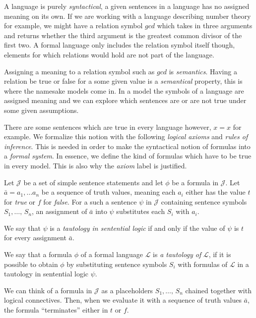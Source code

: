 \documentclass[../../main.tex]{subfiles}
\begin{document}
A language is purely \textit{syntactical}, a given sentences in a language has no assigned meaning on its own.
If we are working with a language describing number theory for example, 
we might have a relation symbol $gcd$ which takes in three arguments and returns whether the third argument is the greatest common divisor of the first two.
A formal language only includes the relation symbol itself though, elements for which relations would hold are not part of the language.

Assigning a meaning to a relation symbol such as $gcd$ is \textit{semantics}.
Having a relation be true or false for a some given value is a \textit{semantical} property, this is where the namesake models come in.
In a model the symbols of a language are assigned meaning and we can explore which sentences are or are not true under some given assumptions.\cite[p.3]{Cha90}

There are some sentences which are true in every language however, $x = x$ for example.
We formalize this notion with the following \textit{logical axioms} and \textit{rules of inference}.
This is needed in order to make the syntactical notion of formulas into a \textit{formal system}.
In essence, we define the kind of formulas which have to be true in every model.
This is also why the \textit{axiom} label is justified.

\begin{definition}[Tautology]\cite[pp.8, 24]{Cha90}
    Let $\mathcal{J}$ be a set of simple sentence statements and let $\phi$ be a formula in $\mathcal{J}$.
    Let $\bar{a} = a_1,\ldots a_n$ be a sequence of truth values, meaning each $a_i$ either has the value $t$ for \textit{true} or $f$ for \textit{false}.
    For a such a sentence $\psi$ in $\mathcal{J}$ containing sentence symbols $S_1,\ldots,\, S_n$, 
    an assignment of $\bar{a}$ into $\psi$ substitutes each $S_i$ with $a_i$.

    We say that $\psi$ is a \textit{tautology in sentential logic} if and only if the value of $\psi$ is $t$ for every assignment $\bar{a}$.

    We say that a formula $\phi$ of a formal language $\mathcal{L}$ is \textit{a tautology of} $\mathcal{L}$, 
    if it is possible to obtain $\phi$ by substituting sentence symbols $S_i$ with formulas of $\mathcal{L}$ in a tautology in sentential logic $\psi$. 
\end{definition}

We can think of a formula in $\mathcal{J}$ as a placeholders $S_1,\ldots,\, S_n$ chained together with logical connectives.
Then, when we evaluate it with a sequence of truth values $\bar{a}$, the formula ``terminates'' either in $t$ or $f$.
\end{document}
